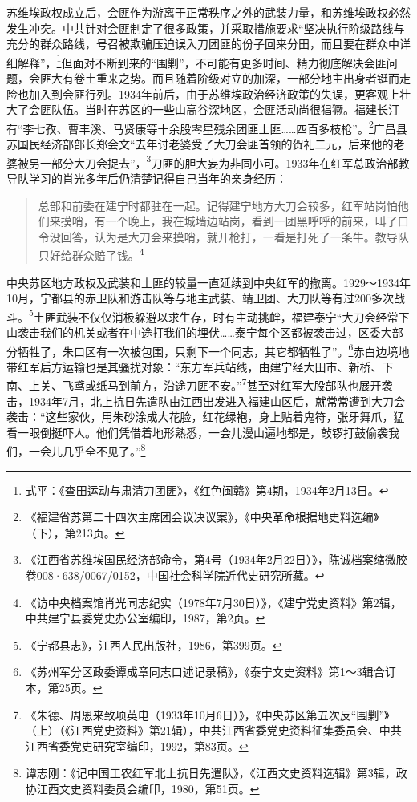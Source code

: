 苏维埃政权成立后，会匪作为游离于正常秩序之外的武装力量，和苏维埃政权必然发生冲突。中共针对会匪制定了很多政策，并采取措施要求“坚决执行阶级路线与充分的群众路线，号召被欺骗压迫误入刀团匪的份子回来分田，而且要在群众中详细解释”，\footnote{式平：《查田运动与肃清刀团匪》，《红色闽赣》第4期，1934年2月13日。}但面对不断到来的“围剿”，不可能有更多时间、精力彻底解决会匪问题，会匪大有卷土重来之势。而且随着阶级对立的加深，一部分地主出身者铤而走险也加入到会匪行列。1934年前后，由于苏维埃政治经济政策的失误，更客观上壮大了会匪队伍。当时在苏区的一些山高谷深地区，会匪活动尚很猖獗。福建长汀有“李七孜、曹丰溪、马贤康等十余股零星残余团匪土匪……四百多枝枪”。\footnote{《福建省苏第二十四次主席团会议决议案》，《中央革命根据地史料选编》（下），第213页。}广昌县苏国民经济部部长郑会文“去年讨老婆受了大刀会匪首领的贺礼二元，后来他的老婆被另一部分大刀会捉去”，\footnote{《江西省苏维埃国民经济部命令，第4号（1934年2月22日）》，陈诚档案缩微胶卷008·638/0067/0152，中国社会科学院近代史研究所藏。}刀匪的胆大妄为非同小可。1933年在红军总政治部教导队学习的肖光多年后仍清楚记得自己当年的亲身经历：

\begin{quote}

总部和前委在建宁时都驻在一起。记得建宁地方大刀会较多，红军站岗怕他们来摸哨，有一个晚上，我在城墙边站岗，看到一团黑呼呼的前来，叫了口令没回答，认为是大刀会来摸哨，就开枪打，一看是打死了一条牛。教导队只好给群众赔了钱。\footnote{《访中央档案馆肖光同志纪实（1978年7月30日）》，《建宁党史资料》第2辑，中共建宁县委党史办公室编印，1987，第2页。}
\end{quote}


中央苏区地方政权及武装和土匪的较量一直延续到中央红军的撤离。1929～1934年10月，宁都县的赤卫队和游击队等与地主武装、靖卫团、大刀队等有过200多次战斗。\footnote{《宁都县志》，江西人民出版社，1986，第399页。}土匪武装不仅仅消极躲避以求生存，时有主动挑衅，福建泰宁“大刀会经常下山袭击我们的机关或者在中途打我们的埋伏……泰宁每个区都被袭击过，区委大部分牺牲了，朱口区有一次被包围，只剩下一个同志，其它都牺牲了”。\footnote{《苏州军分区政委谭成章同志口述记录稿》，《泰宁文史资料》第1～3辑合订本，第25页。}赤白边境地带红军后方运输也是其骚扰对象：“东方军兵站线，由建宁经大田市、新桥、下南、上关、飞鸢或纸马到前方，沿途刀匪不安。”\footnote{《朱德、周恩来致项英电（1933年10月6日）》，《中央苏区第五次反“围剿”》（上）（《江西党史资料》第21辑），中共江西省委党史资料征集委员会、中共江西省委党史研究室编印，1992，第83页。}甚至对红军大股部队也展开袭击，1934年7月，北上抗日先遣队由江西出发进入福建山区后，就常常遭到大刀会袭击：“这些家伙，用朱砂涂成大花脸，红花绿袍，身上贴着鬼符，张牙舞爪，猛看一眼倒挺吓人。他们凭借着地形熟悉，一会儿漫山遍地都是，敲锣打鼓偷袭我们，一会儿几乎全不见了。”\footnote{谭志刚：《记中国工农红军北上抗日先遣队》，《江西文史资料选辑》第3辑，政协江西文史资料委员会编印，1980，第51页。}


